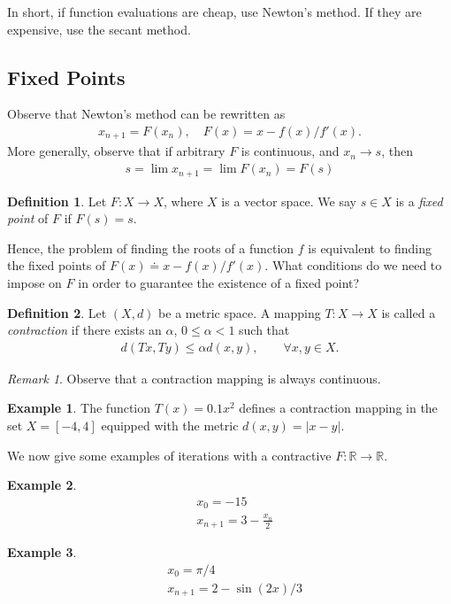 \documentclass[12pt]{article}
\newcommand{\rr}{\mathbb{R}}
\theoremstyle{plain}
\theoremstyle{definition}
\newtheorem*{definition}{Definition}
\newtheorem*{example}{Example}
\theoremstyle{remark}
\newtheorem*{remark}{Remark}
\numberwithin{equation}{section}  %
\begin{document}
In short, if function evaluations are cheap, use Newton's method. If they are
expensive, use the secant method.
\subsection{Fixed Points}
Observe that Newton's method can be rewritten as 
\begin{align*}
	x_{n+1} = F(x_n), \quad F(x) = x - f(x)/f'(x).
\end{align*}
More generally, observe that if arbitrary $F$ is continuous, and
$x_n \to s$, then
\begin{align*}
	s = \lim {x_{n+1}} = \lim F(x_n) = F(s)
\end{align*}
\begin{definition}
	Let $F: X \to X$, where $X$ is a vector space. We say $s \in X$ is a 
	\emph{fixed point} of $F$ if $F(s) = s$.
\end{definition}
Hence, the problem of finding the roots of a function $f$ is equivalent
to finding the fixed points of $F(x) \doteq x - f(x)/f'(x)$.
What conditions do we need to impose on $F$ in order to guarantee
the existence of a fixed point?
\begin{definition}
	Let $\left( X, d \right)$ be a metric space. A mapping $T: X \to X$ is called a
	\emph{contraction} if there exists an $\alpha$, $0 \le \alpha <1$ such that
	\begin{equation*}
		\begin{split}
			d(Tx, Ty) \le \alpha d(x,y), \qquad \forall x, y \in X.
		\end{split}
	\end{equation*}
\end{definition}
\begin{remark}
	Observe that a contraction mapping is always continuous.
\end{remark}
\begin{example}
	The function $T(x) = 0.1x^2$ defines a contraction mapping in the set 
	$X = [-4, 4]$ equipped with the metric $d(x,y) = |x-y|$. 
\end{example}
We now give some examples of iterations with a contractive $F: \rr \to \rr$.
\begin{example}
	\begin{align*}
		& x_0 = -15
		\\
		& x_{n+1} = 3 - \frac{x_n}{2}
	\end{align*}
\end{example}
\begin{example}
	\begin{align*}
		& x_0 = \pi/4
		\\
		& x_{n+1} = 2 - \sin(2x)/3
	\end{align*}
\end{example} 
\end{document}
